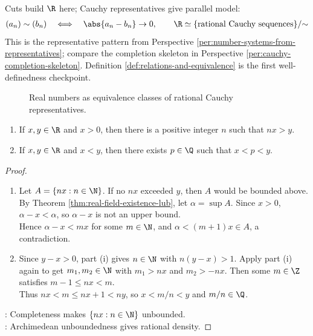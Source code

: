 \begin{perspective} \label{per:cauchy-construction-of-reals-parallel-model} \\
Cuts build $\R$ here; Cauchy representatives give parallel model:
\begin{align}
(a_n)\sim(b_n)\quad\Longleftrightarrow\quad \abs{a_n-b_n}\to0,\qquad
\R \simeq \{\text{rational Cauchy sequences}\}/{\sim} \nonumber
\end{align}
This is the representative pattern from Perspective \ref{per:number-systems-from-representatives}; compare the completion skeleton in Perspective \ref{per:cauchy-completion-skeleton}. Definition \ref{def:relations-and-equivalence} is the first well-definedness checkpoint.
\end{perspective}

\begin{figure}[H]
  \centering
  
  \caption{Real numbers as equivalence classes of rational Cauchy representatives.}
  \label{fig:cauchy-completion-formal-limits}
\end{figure}

\begin{theorem} \label{thm:archimedean-and-rational-density} 
\begin{enumerate}[label=(\roman*)]
\setlength{\itemsep}{0pt}
\item If $x,y\in\R$ and $x>0$, then there is a positive integer $n$ such that $nx>y$.
\item If $x,y\in\R$ and $x<y$, then there exists $p\in\Q$ such that $x<p<y$.
\end{enumerate}
\begin{proof}
\begin{enumerate}[label=(\roman*)]
\setlength{\itemsep}{0pt}
\item Let $A=\{nx:n\in\N\}$. If no $nx$ exceeded $y$, then $A$ would be bounded above. By Theorem \ref{thm:real-field-existence-lub}, let $\alpha=\sup A$. Since $x>0$, $\alpha-x<\alpha$, so $\alpha-x$ is not an upper bound.\\
Hence $\alpha-x<mx$ for some $m\in\N$, and $\alpha<(m+1)x\in A$, a contradiction.
\item Since $y-x>0$, part (i) gives $n\in\N$ with $n(y-x)>1$. Apply part (i) again to get $m_1,m_2\in\N$ with $m_1>nx$ and $m_2>-nx$. Then some $m\in\Z$ satisfies $m-1\leq nx<m$.\\
Thus $nx<m\leq nx+1<ny$, so $x<m/n<y$ and $m/n\in\Q$.
\end{enumerate}
: Completeness makes $\{nx:n\in\N\}$ unbounded.\\
: Archimedean unboundedness gives rational density.
\end{proof}
\end{theorem}

